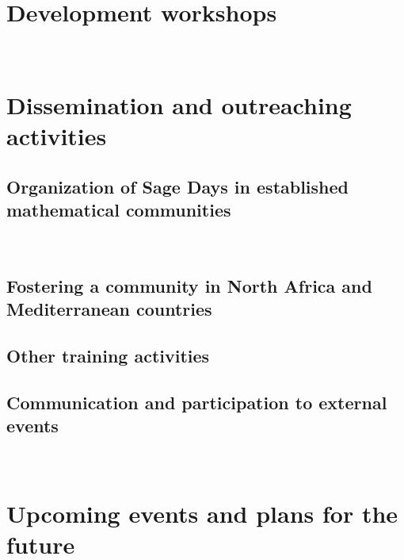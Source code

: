 \documentclass{../../Proposal/LaTeX-proposal/deliverablereport}
\author{Viviane Pons}
\begin{document}
\maketitle
\githubissuedescription

\section{Development workshops}
~


\vspace{0.5cm}


\section{Dissemination and outreaching activities}

\subsection{Organization of Sage Days in established mathematical communities}
~


\vspace{0.5cm}


\subsection{Fostering a community in North Africa and Mediterranean countries}

\subsection{Other training activities}

\subsection{Communication and participation to external events}
~


\vspace{0.5cm}



\section{Upcoming events and plans for the future}
\end{document}
